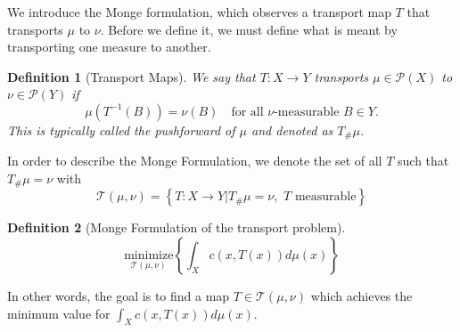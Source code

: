 \documentclass[12pt]{article}
\theoremstyle{plain}
\newtheorem{defn}{Definition}[section]
\numberwithin{equation}{section}
\begin{document}
We introduce
the Monge formulation, which observes a transport map $T$ that transports $\mu$ to $\nu$. Before we define it, we must define what is meant by transporting one measure to another.
\begin{defn}[Transport Maps]\label{defn:transport_map}
  We say that $T: X\to Y$ transports $\mu\in \mathcal{P}(X)$ to $\nu\in\mathcal{P}(Y)$ if 
  \begin{equation*}\label{eqn:pushforward}
    \mu(T^{-1}(B)) = \nu(B) \quad\text{for all $\nu$-measurable $B\in Y$.}
  \end{equation*}
  This is typically called the \textit{pushforward} of $\mu$ and denoted as $T_\#\mu$.
\end{defn} 
In order to describe the Monge Formulation, we denote the set of all $T$ such that $T_\#\mu=\nu$ with
\begin{equation}
  \mathcal{T}(\mu,\nu) = \left\{T: X\to Y \vert T_\#\mu = \nu,\,\,\text{$T$ measurable} \right\}
\end{equation}
\begin{defn}[Monge Formulation of the transport problem]\label{defn:monge}
  \begin{equation}
    \underset{\mathcal{T}(\mu,\nu)}{\text{minimize}}\left\{\int_X c(x,T(x))d\mu(x)\right\}
  \end{equation}
\end{defn}
In other words, the goal is to find a map $T\in\mathcal{T}(\mu,\nu)$ which achieves the minimum value for $\int_X c(x,T(x))d\mu(x)$.
\end{document}
